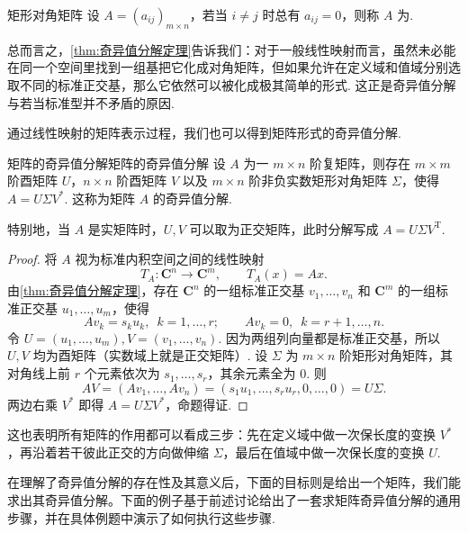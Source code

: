\begin{definition}{矩形对角矩阵}{} 
    设 $A = (a_{ij})_{m \times n}$，若当 $i \neq j$ 时总有 $a_{ij} = 0$，则称 $A$ 为.
\end{definition}

总而言之，\autoref{thm:奇异值分解定理}告诉我们：对于一般线性映射而言，虽然未必能在同一个空间里找到一组基把它化成对角矩阵，但如果允许在定义域和值域分别选取不同的标准正交基，那么它依然可以被化成极其简单的形式. 这正是奇异值分解与若当标准型并不矛盾的原因.

通过线性映射的矩阵表示过程，我们也可以得到矩阵形式的奇异值分解.

\begin{theorem}{矩阵的奇异值分解}{矩阵的奇异值分解}
    设 $A$ 为一 $m \times n$ 阶复矩阵，则存在 $m \times m$ 阶酉矩阵 $U$，$n \times n$ 阶酉矩阵 $V$ 以及 $m \times n$ 阶非负实数矩形对角矩阵 $\Sigma$，使得 $A = U \Sigma V^*$. 这称为矩阵 $A$ 的奇异值分解.

    特别地，当 $A$ 是实矩阵时，$U, V$ 可以取为正交矩阵，此时分解写成 $A = U \Sigma V^{\mathrm{T}}$.
\end{theorem}

\begin{proof}
    将 $A$ 视为标准内积空间之间的线性映射
    \[
        T_A : \mathbf{C}^n \to \mathbf{C}^m,\qquad T_A(x) = Ax.
    \]
    由\autoref{thm:奇异值分解定理}，存在 $\mathbf{C}^n$ 的一组标准正交基 $v_1, \ldots, v_n$ 和 $\mathbf{C}^m$ 的一组标准正交基 $u_1, \ldots, u_m$，使得
    \[
        Av_k = s_k u_k,\enspace k = 1, \ldots, r;\qquad Av_k = 0,\enspace k = r+1, \ldots, n.
    \]
    令 $U = (u_1, \ldots, u_m), V = (v_1, \ldots, v_n)$. 因为两组列向量都是标准正交基，所以 $U, V$ 均为酉矩阵（实数域上就是正交矩阵）. 设 $\Sigma$ 为 $m \times n$ 阶矩形对角矩阵，其对角线上前 $r$ 个元素依次为 $s_1, \ldots, s_r$，其余元素全为 $0$. 则
    \[
        AV = (Av_1, \ldots, Av_n) = (s_1u_1, \ldots, s_ru_r, 0, \ldots, 0) = U\Sigma.
    \]
    两边右乘 $V^*$ 即得 $A = U\Sigma V^*$，命题得证.
\end{proof}

这也表明所有矩阵的作用都可以看成三步：先在定义域中做一次保长度的变换 $V^*$，再沿着若干彼此正交的方向做伸缩 $\Sigma$，最后在值域中做一次保长度的变换 $U$.

在理解了奇异值分解的存在性及其意义后，下面的目标则是给出一个矩阵，我们能求出其奇异值分解。下面的例子基于前述讨论给出了一套求矩阵奇异值分解的通用步骤，并在具体例题中演示了如何执行这些步骤.

